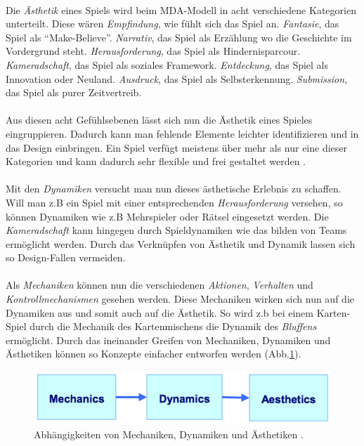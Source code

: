 \documentclass[a4paper,12pt]{scrartcl}
\begin{document}
\\
Die \textit{Ästhetik} eines Spiels wird beim MDA-Modell in acht verschiedene Kategorien unterteilt. Diese wären \textit{Empfindung}, wie fühlt sich das Spiel an. \textit{Fantasie}, das Spiel als \enquote{Make-Believe}. \textit{Narrativ}, das Spiel als Erzählung wo die Geschichte im Vordergrund steht. \textit{Herausforderung}, das Spiel als Hindernisparcour. \textit{Kameradschaft}, das Spiel als soziales Framework. \textit{Entdeckung}, das Spiel als Innovation oder Neuland. \textit{Ausdruck}, das Spiel als Selbsterkennung. \textit{Submission}, das Spiel als purer Zeitvertreib.
\\\\
Aus diesen acht Gefühlsebenen lässt sich nun die Ästhetik eines Spieles eingruppieren. Dadurch kann man fehlende Elemente leichter identifizieren und in das Design einbringen. Ein Spiel verfügt meistens über mehr als nur eine dieser Kategorien und kann dadurch sehr flexible und frei gestaltet werden \cite{Hunicke2004}.
\\\\
Mit den \textit{Dynamiken} versucht man nun dieses ästhetische Erlebnis zu schaffen. Will man z.B ein Spiel mit einer entsprechenden \textit{Herausforderung} versehen, so können Dynamiken wie z.B Mehrspieler oder Rätsel eingesetzt werden. Die \textit{Kameradschaft} kann hingegen durch Spieldynamiken wie das bilden von Teams ermöglicht werden. Durch das Verknüpfen von Ästhetik und Dynamik lassen sich so Design-Fallen vermeiden.
\\\\
Als \textit{Mechaniken} können nun die verschiedenen \textit{Aktionen}, \textit{Verhalten} und \textit{Kontrollmechanismen} gesehen werden. Diese Mechaniken wirken sich nun auf die Dynamiken aus und somit auch auf die Ästhetik. So wird z.b bei einem Karten-Spiel durch die Mechanik des Kartenmischens die Dynamik des \textit{Bluffens} ermöglicht. Durch das ineinander Greifen von Mechaniken, Dynamiken und Ästhetiken können so Konzepte einfacher entworfen werden (Abb.\ref{MDABild}). 
\begin{figure}[h!]
\begin{center}
\includegraphics[scale = 1.0]{Bilder/MDA.eps}
\caption{Abhängigkeiten von Mechaniken, Dynamiken und Ästhetiken \cite{Hunicke2004}.}
\label{MDABild}
\end{center}
\end{figure}
\end{document}
